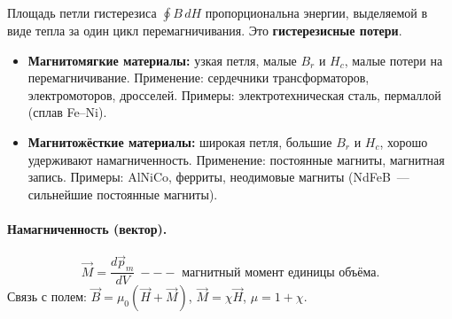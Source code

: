\documentclass[12pt]{article}
\begin{document}
Площадь петли гистерезиса $\oint B\,dH$ пропорциональна энергии, выделяемой в
виде тепла за один цикл перемагничивания. Это \textbf{гистерезисные потери}.

\begin{itemize}
    \item \textbf{Магнитомягкие материалы:} узкая петля, малые $B_r$ и $H_c$,
          малые потери на перемагничивание. Применение: сердечники
          трансформаторов, электромоторов, дросселей. Примеры: электротехническая
          сталь, пермаллой (сплав Fe--Ni).
    \item \textbf{Магнитожёсткие материалы:} широкая петля, большие $B_r$ и
          $H_c$, хорошо удерживают намагниченность. Применение: постоянные
          магниты, магнитная запись. Примеры: AlNiCo, ферриты, неодимовые
          магниты (NdFeB~--- сильнейшие постоянные магниты).
\end{itemize}

\paragraph{Намагниченность (вектор).}
\[
    \vec{M} = \frac{d\vec{p}_m}{dV}~---\text{ магнитный момент единицы объёма.}
\]
Связь с полем: $\vec{B} = \mu_0(\vec{H} + \vec{M})$, $\vec{M} = \chi\vec{H}$,
$\mu = 1 + \chi$.
\end{document}
